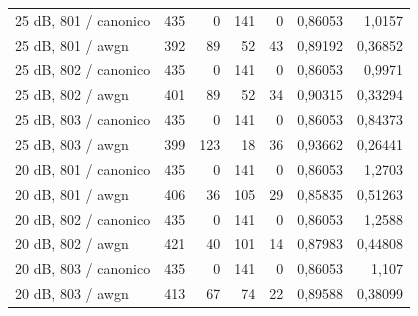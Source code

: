 \begin{longtable}{@{}p{.38\linewidth}rrrrrr@{}}
25 dB, 801 /\allowbreak{} canonico & 435 & 0 & 141 & 0 & 0,86053 & 1,0157\\
25 dB, 801 /\allowbreak{} awgn & 392 & 89 & 52 & 43 & 0,89192 & 0,36852\\
25 dB, 802 /\allowbreak{} canonico & 435 & 0 & 141 & 0 & 0,86053 & 0,9971\\
25 dB, 802 /\allowbreak{} awgn & 401 & 89 & 52 & 34 & 0,90315 & 0,33294\\
25 dB, 803 /\allowbreak{} canonico & 435 & 0 & 141 & 0 & 0,86053 & 0,84373\\
25 dB, 803 /\allowbreak{} awgn & 399 & 123 & 18 & 36 & 0,93662 & 0,26441\\
20 dB, 801 /\allowbreak{} canonico & 435 & 0 & 141 & 0 & 0,86053 & 1,2703\\
20 dB, 801 /\allowbreak{} awgn & 406 & 36 & 105 & 29 & 0,85835 & 0,51263\\
20 dB, 802 /\allowbreak{} canonico & 435 & 0 & 141 & 0 & 0,86053 & 1,2588\\
20 dB, 802 /\allowbreak{} awgn & 421 & 40 & 101 & 14 & 0,87983 & 0,44808\\
20 dB, 803 /\allowbreak{} canonico & 435 & 0 & 141 & 0 & 0,86053 & 1,107\\
20 dB, 803 /\allowbreak{} awgn & 413 & 67 & 74 & 22 & 0,89588 & 0,38099\\
\bottomrule\end{longtable}\normalsize

